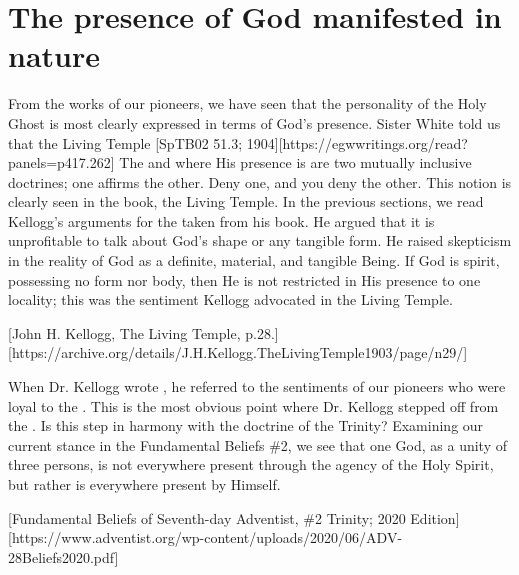 \section*{The presence of God manifested in nature}

From the works of our pioneers, we have seen that the personality of the Holy Ghost is most clearly expressed in terms of God's presence. Sister White told us that the Living Temple [SpTB02 51.3; 1904][https://egwwritings.org/read?panels=p417.262] The  and where His presence is are two mutually inclusive doctrines; one affirms the other. Deny one, and you deny the other. This notion is clearly seen in the book, the Living Temple. In the previous sections, we read Kellogg's arguments for the  taken from his book. He argued that it is unprofitable to talk about God's shape or any tangible form. He raised skepticism in the reality of God as a definite, material, and tangible Being. If God is spirit, possessing no form nor body, then He is not restricted in His presence to one locality; this was the sentiment Kellogg advocated in the Living Temple.

[John H. Kellogg, The Living Temple, p.28.][https://archive.org/details/J.H.Kellogg.TheLivingTemple1903/page/n29/]

When Dr. Kellogg wrote , he referred to the sentiments of our pioneers who were loyal to the . This is the most obvious point where Dr. Kellogg stepped off from the . Is this step in harmony with the doctrine of the Trinity? Examining our current stance in the Fundamental Beliefs \#2, we see that one God, as a unity of three persons, is not everywhere present through the agency of the Holy Spirit, but rather is everywhere present by Himself.

[Fundamental Beliefs of Seventh-day Adventist, \#2 Trinity; 2020 Edition][https://www.adventist.org/wp-content/uploads/2020/06/ADV-28Beliefs2020.pdf]

